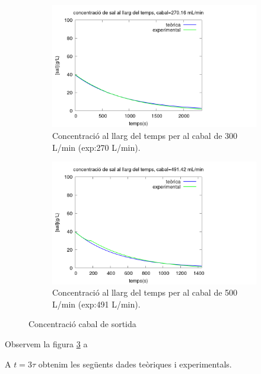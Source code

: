 \documentclass[10pt, twoside]{article}
\begin{document}
\begin{figure}[hbt!]
    \centering
    \begin{subfigure}{0.45\textwidth}
        \centering
        \includegraphics[width=\textwidth]{conc300.png}
        \caption{Concentració al llarg del temps per al cabal de 300 L/min (exp:270 L/min).}
        \label{fig:conc300}
    \end{subfigure}
    \hspace{0.025\textwidth}
    \begin{subfigure}{0.45\textwidth}
        \centering
        \includegraphics[width=\textwidth]{conc500.png}
        \caption{Concentració al llarg del temps per al cabal de 500 L/min (exp:491 L/min).}
        \label{fig:conc500}
    \end{subfigure}
    \caption{Concentració cabal de sortida}
    \label{fig:concs}
\end{figure}

Observem la figura \ref{fig:concs} a

A $t=3\tau$ obtenim les següents dades teòriques i experimentals.
\end{document}
